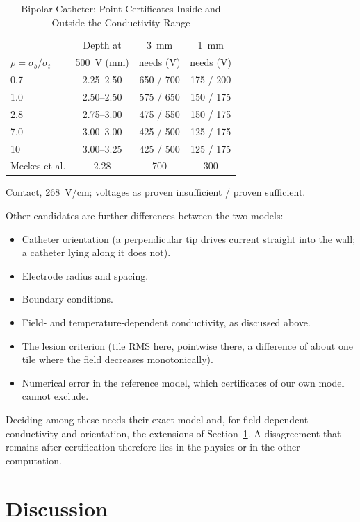\documentclass[11pt]{article}
\begin{document}
\begin{table}[t]
\centering
\caption{Bipolar Catheter: Point Certificates Inside and Outside the Conductivity Range}\label{tab:rho}
\small\setlength{\tabcolsep}{3pt}
\begin{tabular}{lccc}
\toprule
& Depth at & \SI{3}{mm} & \SI{1}{mm}\\
$\rho=\sigma_b/\sigma_t$ & \SI{500}{V} (mm) & needs (V) & needs (V)\\
\midrule
0.7 & 2.25--2.50 & 650 / 700 & 175 / 200\\
1.0 & 2.50--2.50 & 575 / 650 & 150 / 175\\
2.8 & 2.75--3.00 & 475 / 550 & 150 / 175\\
7.0 & 3.00--3.00 & 425 / 500 & 125 / 175\\
10 & 3.00--3.25 & 425 / 500 & 125 / 175\\
Meckes et al. & 2.28 & 700 & 300\\
\bottomrule
\end{tabular}
\par\vspace{2pt}\footnotesize\raggedright Contact, \SI{268}{V/cm}; voltages as proven insufficient / proven sufficient.
\end{table}

Other candidates are further differences between the two models:
\begin{itemize}
\item Catheter orientation (a perpendicular tip drives current straight into
the wall; a catheter lying along it does not).
\item Electrode radius and spacing.
\item Boundary conditions.
\item Field- and temperature-dependent conductivity, as discussed above.
\item The lesion criterion (tile RMS here, pointwise there, a difference of
about one tile where the field decreases monotonically).
\item Numerical error in the reference model, which certificates of our own
model cannot exclude.
\end{itemize}
Deciding among these needs their exact model and, for field-dependent
conductivity and orientation, the extensions of Section~\ref{sec:discussion}.
A disagreement that remains after certification therefore lies in the physics or in
the other computation.

\section{Discussion}\label{sec:discussion}
\end{document}
